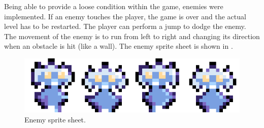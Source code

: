 Being able to provide a loose condition within the game, enemies were implemented.
If an enemy touches the player, the game is over and the actual level has to be restarted.
The player can perform a jump to dodge the enemy.
The movement of the enemy is to run from left to right and changing its direction when an obstacle is hit (like a wall).
The enemy sprite sheet is shown in .
\begin{figure}[!ht]
  \centering
  \includegraphics[height=0.08\textwidth]{./6_game/figs/game_design_mechanic_enemy}
  \caption{Enemy sprite sheet.}
  \label{fig:game_design_mechanic_enemy}
\end{figure}
\FloatBarrier
\noindent



